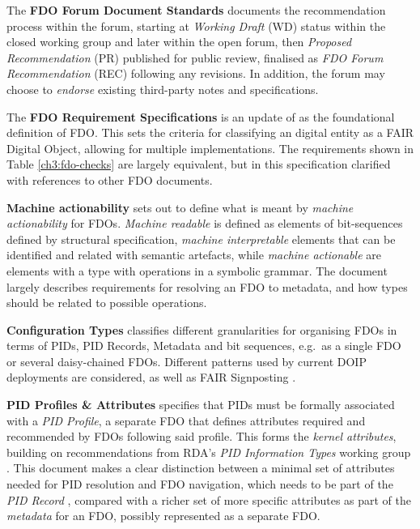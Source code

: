 The \textbf{FDO Forum Document Standards} \cite{Weiland 2022a} documents the recommendation process within the forum, starting at \emph{Working Draft} (WD) status within the closed working group and later within the open forum, then \emph{Proposed Recommendation} (PR) published for public review, finalised as \emph{FDO Forum Recommendation} (REC) following any revisions. In addition, the forum may choose to \emph{endorse} existing third-party notes and specifications.

The \textbf{FDO Requirement Specifications} \cite{Anders 2023} is an update of \cite{Bonino 2019} as the foundational definition of FDO. This sets the criteria for classifying an digital entity as a FAIR Digital Object, allowing for multiple implementations. The requirements shown in Table \vref{ch3:fdo-checks} are largely equivalent, but in this specification clarified with references to other FDO documents.

\textbf{Machine actionability}\label{def:machineactionable} \cite{Weiland 2022b} sets out to define what is meant by \emph{machine actionability} for FDOs. \emph{Machine readable} is defined as elements of bit-sequences defined by structural specification, \emph{machine interpretable} elements that can be identified and related with semantic artefacts, while \emph{machine actionable} are elements with a type with operations in a symbolic grammar. The document largely describes requirements for resolving an FDO to metadata, and how types should be related to possible operations.

\textbf{Configuration Types} \cite{Lannom 2022a} classifies different granularities for organising FDOs in terms of PIDs, PID Records, Metadata and bit sequences, e.g.~as a single FDO or several daisy-chained FDOs. Different patterns used by current DOIP deployments are considered, as well as FAIR Signposting \cite{Van de Sompel 2015,Van de Sompel 2022}.

\textbf{PID Profiles \& Attributes} \cite{Anders 2022} specifies that PIDs must be formally associated with a \emph{PID Profile}, a separate FDO that defines attributes required and recommended by FDOs following said profile. This forms the \emph{kernel attributes}, building on recommendations from RDA's \emph{PID Information Types} working group \cite{Weigel 2018}. This document makes a clear distinction between a minimal set of attributes needed for PID resolution and FDO navigation, which needs to be part of the \emph{PID Record} \cite{Islam 2023}, compared with a richer set of more specific attributes as part of the \emph{metadata} for an FDO, possibly represented as a separate FDO.


